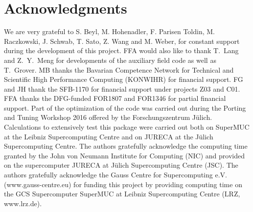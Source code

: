 \section*{Acknowledgments} 

We are very grateful to  S. Beyl, M. Hohenadler,  F. Parisen Toldin,  M. Raczkowski,  J. Schwab, T. Sato, Z. Wang and M. Weber,  for constant support during the development of this project.  FFA would also like to thank T.~Lang   and Z.~Y.~Meng for  developments of the auxiliary field code as well as T.~Grover. 
MB thanks the Bavarian Competence Network for Technical and Scientific High Performance Computing (KONWIHR) for financial support. FG  and JH thank the SFB-1170 for  financial support under projects Z03 and C01.  FFA thanks the DFG-funded FOR1807 and FOR1346 for partial financial support.
Part of the optimization of the code was carried out during  the  Porting and Tuning Workshop 2016 offered by the Forschungszentrum J\"ulich.
Calculations  to extensively test this package were carried out both on  SuperMUC at the  Leibniz Supercomputing Centre and on  JURECA at the J\"ulich Supercomputing Centre.
 The authors gratefully acknowledge the computing time granted by the John von Neumann Institute for Computing (NIC) and provided on the supercomputer JURECA \cite{Jureca16} at Jülich Supercomputing Centre (JSC). The authors gratefully acknowledge the Gauss Centre for Supercomputing e.V. (www.gauss-centre.eu) for funding this project by providing computing time on the GCS Supercomputer SuperMUC at Leibniz Supercomputing Centre (LRZ, www.lrz.de).